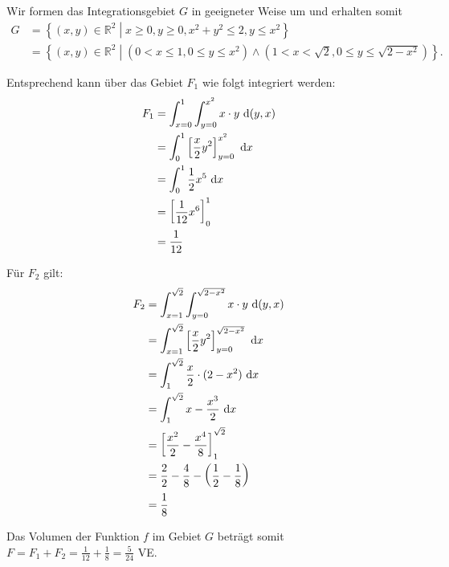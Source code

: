 \documentclass[main.tex]{subfiles}
\begin{document}
Wir formen das Integrationsgebiet $G$ in geeigneter Weise um und erhalten somit
\begin{align*}
    G &= \left\{ (x,y) \in \mathbb{R}^2 \middle| x  \geq 0, y \geq 0, x^2 + y^2 \leq 2, y \leq x^2 \right\} \\
      &= \left\{ (x,y) \in \mathbb{R}^2 \middle|
      \left(0 < x \leq 1, 0 \leq y \leq x^2\right) \wedge \left( 1 < x < \sqrt{2}, 0 \leq y \leq \sqrt{2-x^2} \right)
      \right\}.
\end{align*}

Entsprechend kann über das Gebiet $F_1$ wie folgt integriert werden:
\begin{align*}
    F_1 &= \int_{x=0}^{1} \int_{y=0}^{x^2} x\cdot y ~\mathrm{d}(y,x) \\
        &= \int_{0}^{1} \left[ \frac{x}{2} y^2 \right]_{y=0}^{x^2} ~\mathrm{d}x \\
        &= \int_{0}^{1} \frac{1}{2} x^5 ~\mathrm{d}x \\
        &= \left[ \frac{1}{12} x^6 \right]_{0}^{1} \\
        &= \frac{1}{12} \\
\end{align*}

Für $F_2$ gilt:
\begin{align*}
  F_2 &= \int_{x=1}^{\sqrt{2}} \int_{y=0}^{\sqrt{2-x^2}} x\cdot y ~\mathrm{d}(y,x) \\
      &= \int_{x=1}^{\sqrt{2}} \left[ \frac{x}{2} y^2 \right]_{y=0}^{\sqrt{2-x^2}} ~\mathrm{d}x \\
      &= \int_{1}^{\sqrt{2}} \frac{x}{2}\cdot (2-x^2) ~\mathrm{d}x \\
      &= \int_{1}^{\sqrt{2}} x - \frac{x^3}{2} ~\mathrm{d}x \\
      &= \left[ \frac{x^2}{2} - \frac{x^4}{8} \right]_{1}^{\sqrt{2}} \\
      &= \frac{2}{2} - \frac{4}{8} - \left( \frac{1}{2} - \frac{1}{8} \right) \\
      &= \frac{1}{8}
\end{align*}

Das Volumen der Funktion $f$ im Gebiet $G$ beträgt somit $F = F_1 + F_2 = \frac{1}{12} + \frac{1}{8} = \frac{5}{24}$ VE.
\end{document}
